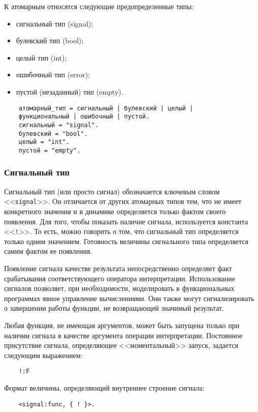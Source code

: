 {К атомарным относятся следующие предопределенные типы:

\begin{itemize}
	\item сигнальный тип (signal);
	\item булевский тип (bool);
	\item целый тип (int);
	\item ошибочный тип (error);
	\item пустой (незаданный) тип (empty).
\end{itemize}

\begin{verbatim}
    атомарный_тип = сигнальный | булевский | целый |
    функциональный | ошибочный | пустой.
    сигнальный = "signal".
    булевский = "bool".
    целый = "int".
    пустой = "empty".
\end{verbatim}

\subsubsection{Сигнальный тип}

Сигнальный тип (или просто сигнал) обозначается ключевым словом <<\verb|signal|>>. Он отличается от других атомарных типов тем, что не имеет конкретного значения и в динамике определяется только фактом своего появления. Для того, чтобы показать наличие сигнала, используется константа <<\verb|!|>>. То есть, можно говорить о том, что сигнальный тип определяется только одним значением. Готовность величины сигнального типа определяется самим фактом ее появления.

Появление сигнала качестве результата непосредственно определяет факт срабатывания соответствующего оператора интерпретации. Использование сигналов позволяет, при необходимости, моделировать в функциональных программах явное управление вычислениями. Они также могут сигнализировать о завершении работы функции, не возвращающей значимый результат.

Любая функция, не имеющая аргументов, может быть запущена только при наличии сигнала в качестве аргумента операции интерпретации. Постоянное присутствие сигнала, определяющее <<моментальный>> запуск, задается следующим выражением:

\begin{verbatim}
    !:F
\end{verbatim}

Формат величины, определяющий внутреннее строение сигнала:

\begin{verbatim}
    <signal:func, { ! }>.
\end{verbatim}

}
